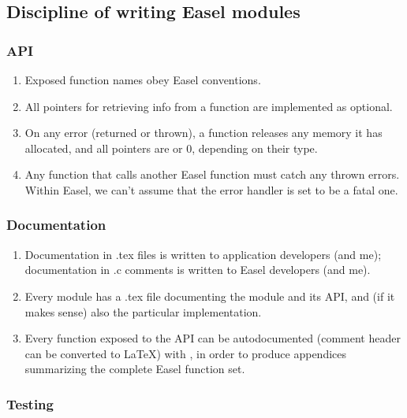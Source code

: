 \subsection{Discipline of writing Easel modules}


\subsubsection{API}

\begin{enumerate}
\item Exposed function names obey Easel conventions.

\item All  pointers for retrieving info from 
      a function are implemented as optional.

\item On any error (returned or thrown), a function releases any
      memory it has allocated, and all  pointers are
       or 0, depending on their type.

\item Any function that calls another Easel function must 
      catch any thrown errors. Within Easel, we
      can't assume that the error handler is set to be a fatal
      one.
\end{enumerate}


\subsubsection{Documentation}

\begin{enumerate}
\item Documentation in .tex files is written to application developers
      (and me); documentation in .c comments is written to Easel
      developers (and me).

\item Every module has a .tex file documenting the module and its API,
      and (if it makes sense) also the particular implementation.

\item Every function exposed to the API can be autodocumented (comment
      header can be converted to \LaTeX) with
      , in order to produce appendices
      summarizing the complete Easel function set.
\end{enumerate}


\subsubsection{Testing}

